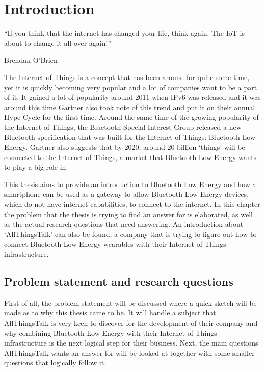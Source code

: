 \documentclass[pdftex,a4paper,12pt,twoside]{report}
\newcommand{\emptypage}{
\newpage
\thispagestyle{empty}
\mbox{}
\newpage
}
\begin{document}
\tableofcontents

\emptypage


\chapter{Introduction}
\label{ch:introduction}
\epigraph{``If you think that the internet has changed your life, think again. The IoT is about to change it all over again!''}{Brendan O'Brien}
The Internet of Things is a concept that has been around for quite some time, yet it is quickly becoming very popular and a lot of companies want to be a part of it. It gained a lot of popularity around 2011 when IPv6 was released and it was around this time Gartner \citep{gartner2012} also took note of this trend and put it on their annual Hype Cycle for the first time. Around the same time of the growing popularity of the Internet of Things, the Bluetooth Special Interest Group released a new Bluetooth specification that was built for the Internet of Things: Bluetooth Low Energy. Gartner \citep{gartner2015} also suggests that by 2020, around 20 billion `things' will be connected to the Internet of Things, a market that Bluetooth Low Energy wants to play a big role in.

This thesis aims to provide an introduction to Bluetooth Low Energy and how a smartphone can be used as a gateway to allow Bluetooth Low Energy devices, which do not have internet capabilities, to connect to the internet. In this chapter the problem that the thesis is trying to find an answer for is elaborated, as well as the actual research questions that need answering. An introduction about `AllThingsTalk' can also be found, a company that is trying to figure out how to connect Bluetooth Low Energy wearables with their Internet of Things infrastructure.

\section{Problem statement and research questions}
\label{sec:problemdefinition}
First of all, the problem statement will be discussed where a quick sketch will be made as to why this thesis came to be. It will handle a subject that AllThingsTalk is very keen to discover for the development of their company and why combining Bluetooth Low Energy with their Internet of Things infrastructure is the next logical step for their business. Next, the main questions AllThingsTalk wants an answer for will be looked at together with some smaller questions that logically follow it.
\end{document}
